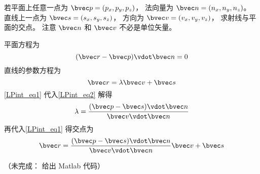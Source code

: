 

若平面上任意一点为 $\bvec p = (p_x, p_y, p_z)$， 法向量为 $\bvec n = (n_x, n_y, n_z)$。 直线上一点为 $\bvec s = (s_x, s_y, s_z)$， 方向为 $\bvec v = (v_x, v_y, v_z)$， 求射线与平面的交点。 注意 $\bvec n$ 和 $\bvec v$ 不必是单位矢量。

平面方程为
\begin{equation}\label{LPint_eq2}
(\bvec r - \bvec p) \vdot \bvec n = 0
\end{equation}
直线的参数方程为
\begin{equation}\label{LPint_eq1}
\bvec r = \lambda \bvec v + \bvec s
\end{equation}
\autoref{LPint_eq1} 代入\autoref{LPint_eq2} 解得
\begin{equation}
\lambda = \frac{(\bvec p - \bvec s)\vdot \bvec n}{\bvec v \vdot \bvec n}
\end{equation}
再代入\autoref{LPint_eq1} 得交点为
\begin{equation}\label{LPint_eq3}
\bvec r = \frac{(\bvec p - \bvec s)\vdot \bvec n}{\bvec v \vdot \bvec n} \bvec v + \bvec s
\end{equation}

（未完成： 给出 Matlab 代码）
